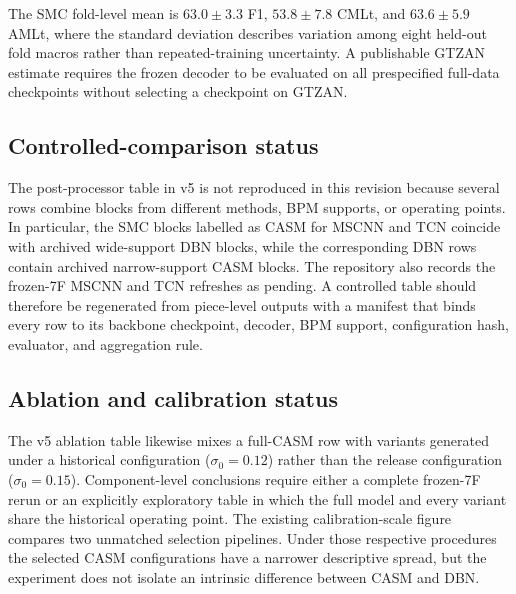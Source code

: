 \documentclass{article}
\begin{document}
The SMC fold-level mean is $63.0\pm3.3$ F1, $53.8\pm7.8$ CMLt, and $63.6\pm5.9$ AMLt, where the standard deviation describes variation among eight held-out fold macros rather than repeated-training uncertainty. A publishable GTZAN estimate requires the frozen decoder to be evaluated on all prespecified full-data checkpoints without selecting a checkpoint on GTZAN.

\subsection{Controlled-comparison status}
The post-processor table in v5 is not reproduced in this revision because several rows combine blocks from different methods, BPM supports, or operating points. In particular, the SMC blocks labelled as CASM for MSCNN and TCN coincide with archived wide-support DBN blocks, while the corresponding DBN rows contain archived narrow-support CASM blocks. The repository also records the frozen-7F MSCNN and TCN refreshes as pending. A controlled table should therefore be regenerated from piece-level outputs with a manifest that binds every row to its backbone checkpoint, decoder, BPM support, configuration hash, evaluator, and aggregation rule.

\subsection{Ablation and calibration status}
The v5 ablation table likewise mixes a full-CASM row with variants generated under a historical configuration ($\sigma_0=0.12$) rather than the release configuration ($\sigma_0=0.15$). Component-level conclusions require either a complete frozen-7F rerun or an explicitly exploratory table in which the full model and every variant share the historical operating point. The existing calibration-scale figure compares two unmatched selection pipelines. Under those respective procedures the selected CASM configurations have a narrower descriptive spread, but the experiment does not isolate an intrinsic difference between CASM and DBN.

\iffalse
\end{document}
